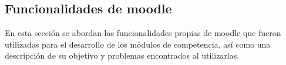 


\subsection{Funcionalidades de moodle}

En esta sección se abordan las funcionalidades propias de moodle que fueron utilizadas para el desarrollo
de los módulos de competencia, así como una descripción de su objetivo y problemas encontrados al utilizarlas.\\

  

